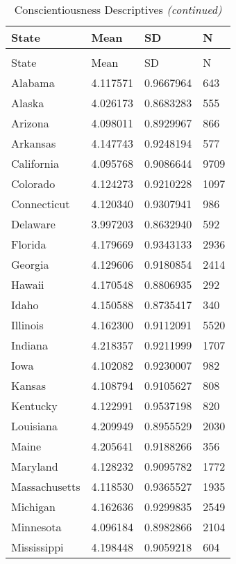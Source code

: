 \documentclass[
]{article}
\begin{document}
\begin{landscape}
\begin{longtable}[t]{llll}
\caption{\label{tab:KableOuput}Conscientiousness Descriptives}\\
\toprule
State & Mean & SD & N\\
\midrule
\endfirsthead
\caption[]{\label{tab:KableOuput}Conscientiousness Descriptives \textit{(continued)}}\\
\toprule
State & Mean & SD & N\\
\midrule
\endhead

\endfoot
\bottomrule
\endlastfoot
Alabama & 4.117571 & 0.9667964 & 643\\
Alaska & 4.026173 & 0.8683283 & 555\\
Arizona & 4.098011 & 0.8929967 & 866\\
Arkansas & 4.147743 & 0.9248194 & 577\\
California & 4.095768 & 0.9086644 & 9709\\
\addlinespace
Colorado & 4.124273 & 0.9210228 & 1097\\
Connecticut & 4.120340 & 0.9307941 & 986\\
Delaware & 3.997203 & 0.8632940 & 592\\
Florida & 4.179669 & 0.9343133 & 2936\\
Georgia & 4.129606 & 0.9180854 & 2414\\
\addlinespace
Hawaii & 4.170548 & 0.8806935 & 292\\
Idaho & 4.150588 & 0.8735417 & 340\\
Illinois & 4.162300 & 0.9112091 & 5520\\
Indiana & 4.218357 & 0.9211999 & 1707\\
Iowa & 4.102082 & 0.9230007 & 982\\
\addlinespace
Kansas & 4.108794 & 0.9105627 & 808\\
Kentucky & 4.122991 & 0.9537198 & 820\\
Louisiana & 4.209949 & 0.8955529 & 2030\\
Maine & 4.205641 & 0.9188266 & 356\\
Maryland & 4.128232 & 0.9095782 & 1772\\
\addlinespace
Massachusetts & 4.118530 & 0.9365527 & 1935\\
Michigan & 4.162636 & 0.9299835 & 2549\\
Minnesota & 4.096184 & 0.8982866 & 2104\\
Mississippi & 4.198448 & 0.9059218 & 604\\

\end{longtable}
\end{landscape}
\end{document}
